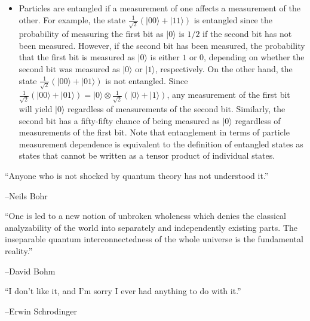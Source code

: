 \documentclass{article}
\def\pagedone{\newpage}
\def\ket#1{|{#1}\rangle}
\def\tensor{\otimes}
\begin{document}
\pagedone

\begin{itemize}
\item Particles are entangled if a measurement of one
affects a measurement of the other. For example, the state 
$\frac{1}{\sqrt{2}}(\ket{00}+\ket{11})$ is entangled since the 
probability of measuring the first bit as $\ket 0$ is $1/2$ 
if the second bit has not been measured. However, if the second bit
has been measured, the probability that the first bit is 
measured as $\ket 0$ is either $1$ or $0$, depending on whether the
second bit was measured as $\ket 0$ or $\ket 1$, respectively. On the other hand, the state
$\frac{1}{\sqrt{2}}(\ket{00}+\ket{01})$ is not entangled. Since 
$\frac{1}{\sqrt{2}}(\ket{00}+\ket{01}) = \ket 0\tensor \frac{1}{\sqrt{2}}(\ket{0}+\ket{1})$, any 
measurement of the first bit will yield $\ket 0$ regardless of
measurements of the second bit.  Similarly, the second bit has a 
fifty-fifty chance of being measured as $\ket 0$ regardless of 
measurements of the first bit. Note that entanglement in terms of particle measurement dependence is equivalent to the definition of entangled
states as states that cannot be written as a tensor product of individual
states.
\end{itemize}

\pagedone

``Anyone who is not shocked by quantum theory has not understood it.''

--Neils Bohr

``One is led to a new notion of unbroken wholeness which denies the classical
analyzability of the world into separately and independently existing parts.
The inseparable quantum interconnectedness of the whole universe is the
fundamental reality.''

--David Bohm

``I don't like it, and I'm sorry I ever had anything to do with it.''

--Erwin Schrodinger
\end{document}
